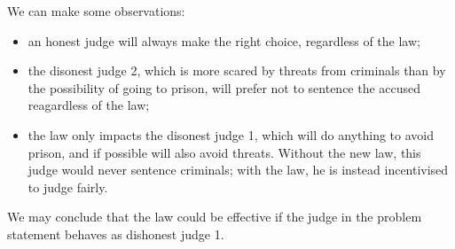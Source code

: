 \documentclass[a4paper, 12pt]{article}
\begin{document}
We can make some observations:
\begin{itemize}
\item an honest judge will always make the right choice, regardless of the law;
\item the disonest judge 2, which is more scared by threats from criminals than by the possibility of going to prison, will prefer not to sentence the accused reagardless of the law;
\item the law only impacts the disonest judge 1, which will do anything to avoid prison, and if possible will also avoid threats. Without the new law, this judge would never sentence criminals; with the law, he is instead incentivised to judge fairly.
\end{itemize}

We may conclude that the law could be effective if the judge in the problem statement behaves as dishonest judge 1.
\end{document}
